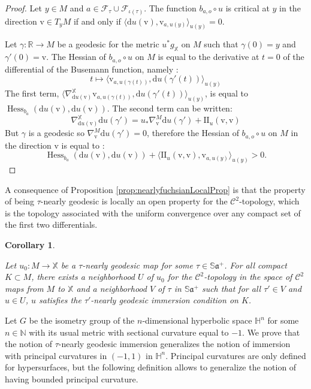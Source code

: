 \documentclass[reqno,10pt]{amsart}
\theoremstyle{plain}
\newtheorem{cor}[thm]{Corollary}
\theoremstyle{definition}
\theoremstyle{remark}
\newcommand{\type}{\tau}
\newcommand{\R}{\mathbb{R}}
\newcommand{\Sph}{\mathbb{S}}
\DeclareMathOperator{\Hess}{Hess}
\newcommand{\II}{\mathrm{I\!I}}
\newcommand{\X}{\mathbb{X}}
\newcommand{\ie}{namely }
\begin{document}
\begin{proof}

Let $y\in M$ and $a\in \mathcal{F}_\type\cup \mathcal{F}_{\iota(\type)}$. The function $b_{a,o}\circ u$ is critical at $y$ in the direction $\mathrm{v}\in T_yM$ if and only if $\langle \mathrm{d}u(\mathrm{v}),\mathrm{v}_{a,u(y)}\rangle_{u(y)}=0$. 

\medskip

Let $\gamma:\R\to M$ be a geodesic for the metric $u^*g_\X$ on $M$ such that $\gamma(0)=y$ and $\gamma'(0)=\mathrm{v}$. The Hessian of $b_{a,o}\circ u$ on $M$ is equal to the derivative at $t=0$ of the differential of the Busemann function, \ie:
$$t\mapsto \langle \mathrm{v}_{a,u(\gamma(t))},\mathrm{d}u(\gamma'(t))\rangle_{u(y)} $$
The first term, $\langle\nabla^\X_{\mathrm{d}u(\mathrm{v})}\mathrm{v}_{a,u(\gamma(t))},\mathrm{d}u(\gamma'(t))\rangle_{u(y)}$, is equal to $\Hess_{b_a}(\mathrm{d}u(\mathrm{v}),\mathrm{d}u(\mathrm{v}))$. The second term can be written:
$$\nabla^\X_{\mathrm{d}u(\mathrm{v})}\mathrm{d}u(\gamma')=u_*\nabla^M_{\mathrm{v}}\mathrm{d}u(\gamma')+\II_u(\mathrm{v},\mathrm{v})$$
But $\gamma$ is a geodesic so $\nabla^M_{\mathrm{v}}\mathrm{d}u(\gamma')=0$, therefore the Hessian of $b_{a,o}\circ u$ on $M$ in the direction $\mathrm{v}$ is equal to :
$$\Hess_{b_a}(\mathrm{d}u(\mathrm{v}),\mathrm{d}u(\mathrm{v}))+\langle\II_u(\mathrm{v},\mathrm{v}),\mathrm{v}_{a,u(y)}\rangle_{u(y)}>0. $$
\end{proof}

A consequence of Proposition \ref{prop:nearlyfuchsianLocalProp} is that the property of being $\type$-nearly geodesic is locally an open property for the $\mathcal{C}^2$-topology, which is the topology associated with the uniform convergence over any compact set of the first two differentials.

\begin{cor}
\label{cor:nearlyfuchsianOpen}

Let $u_0: M\to \X$ be a $\type$-nearly geodesic map for some $\type\in \Sph\mathfrak{a}^+$.  For all compact $K\subset M$, there exists a neighborhood $U$ of $u_0$ for the $\mathcal{C}^2$-topology in the space of $\mathcal{C}^2$ maps from $M$ to $\X$  and a neighborhood $V$ of $\type$ in $\Sph\mathfrak{a}^+$ such that for all $\type'\in V$ and $u\in U$, $u$ satisfies the $\type'$-nearly geodesic immersion condition on $K$.
\end{cor}

Let $G$ be the isometry group of the $n$-dimensional hyperbolic space $\mathbb{H}^n$ for some $n\in \mathbb{N}$ with its usual metric with sectional curvature equal to $-1$. We prove that the notion of $\type$-nearly geodesic immersion generalizes the notion of immersion with principal curvatures in $(-1,1)$ in $\mathbb{H}^n$. Principal curvatures are only defined for hypersurfaces, but the following definition allows to generalize the notion of having bounded principal curvature.
\end{document}

